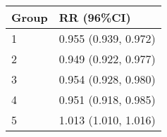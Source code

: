 \begin{tabular}{ll}
  \hline
Group & RR (96\%CI) \\ 
  \hline
   1 & 0.955 (0.939, 0.972) \\ 
     2 & 0.949 (0.922, 0.977) \\ 
     3 & 0.954 (0.928, 0.980) \\ 
     4 & 0.951 (0.918, 0.985) \\ 
     5 & 1.013 (1.010, 1.016) \\ 
   \hline
\end{tabular}

